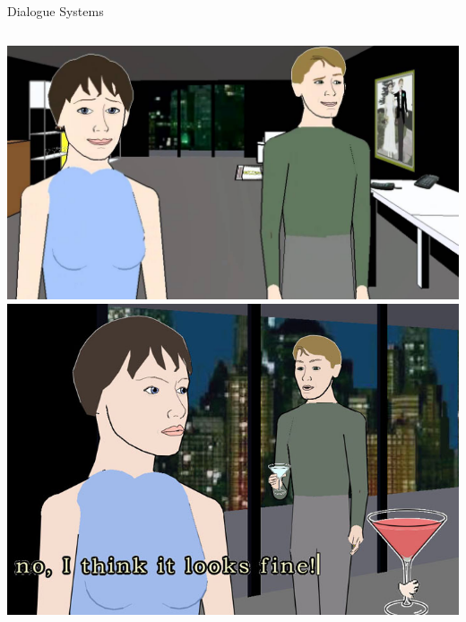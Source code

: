 \documentclass[xcolor={usenames,svgnames,x11names,dvipsnames,table}]{beamer}
\begin{document}
\begin{frame}{Dialogue Systems}
\begin{columns}
        \includegraphics[width=1\linewidth]{./img/facade}\\
        \includegraphics[width=1\linewidth]{./img/facade2}
    \end{columns}
\end{frame}
\end{document}
